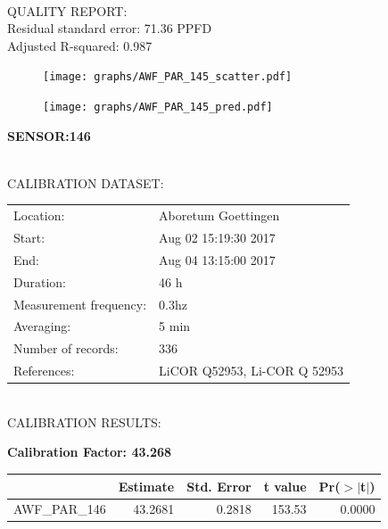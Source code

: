 \documentclass[oneside]{report}
\begin{document}
\hrulefill\\
QUALITY REPORT:\\
Residual standard error: 71.36 PPFD\\
Adjusted R-squared: 0.987



\begin{figure}[H]
  \centering
  \texttt{[image: graphs/AWF\_PAR\_145\_scatter.pdf]}
\end{figure}




\begin{figure}[H]
  \centering
  \texttt{[image: graphs/AWF\_PAR\_145\_pred.pdf]}
\end{figure}

\pagebreak


\begin{center}
\large{\textbf{SENSOR:146}}\\
\end{center}

\hrulefill\\
CALIBRATION DATASET:\\
\begin{table}[h!]
  \centering
  \label{tab:table1}
  \begin{tabular}{ll}
    Location: & Aboretum Goettingen\\ 
    
    
    Start:  & Aug 02 15:19:30 2017 \\
    End:   & Aug 04 13:15:00 2017\\ 
    Duration: & 46 h\\
    Measurement frequency: & 0.3hz\\
    Averaging:  &5 min\\
    Number of records: & 336 \\
    References: & LiCOR Q52953, Li-COR Q 52953 \\
  \end{tabular}
\end{table}

\hrulefill\\
CALIBRATION RESULTS:\\


\begin{center}
\textbf{\large{Calibration Factor: 43.268}}\\
\end{center}
\begin{table}[ht]
\centering
\begin{tabular}{rrrrr}
  \hline
 & Estimate & Std. Error & t value & Pr($>$$|$t$|$) \\ 
  \hline
AWF\_PAR\_146 & 43.2681 & 0.2818 & 153.53 & 0.0000 \\ 
   \hline
\end{tabular}
\end{table}
\end{document}
